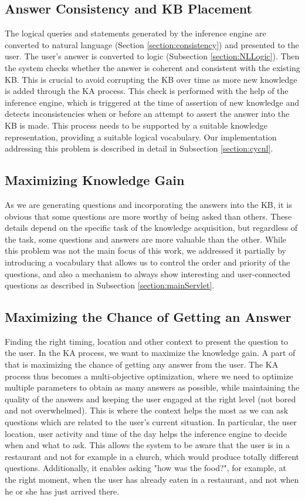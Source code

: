 \subsection{Answer Consistency and KB Placement}
The logical queries and statements generated by the inference engine are 
converted to natural language (Section \ref{section:consistency}) and presented to the user. The user's answer is converted to logic (Subsection \ref{section:NLLogic}). 
Then the system checks whether the answer is coherent and consistent with the 
existing KB. This is crucial to avoid corrupting the KB over time as more new 
knowledge is added through the KA process. This check is performed with the 
help of the inference engine, which is triggered at the time of assertion of 
new knowledge and detects inconsistencies when or before an attempt to 
assert the answer into the KB is made. This process needs to be supported by a 
suitable knowledge representation, providing a suitable logical vocabulary. 
Our implementation addressing this problem is described in detail in 
Subsection \ref{section:cycnl}.

\subsection{Maximizing Knowledge Gain} 
As we are generating questions and incorporating the answers into the KB, it 
is obvious that some questions are more worthy of being asked than others. 
These details depend on the specific task of the knowledge acquisition, but 
regardless of the task, some questions and answers are more valuable than the 
other. While this problem was not the main focus of this work, we addressed it 
partially by introducing a vocabulary that allows us to control the order and 
priority of the questions, and also a mechanism to always show interesting
and user-connected questions as described in Subsection \ref{section:mainServlet}.

\subsection{Maximizing the Chance of Getting an Answer}
Finding the right timing, location and other context to present the question
to the user. In the KA process, we want to maximize the knowledge gain. A part of 
that is maximizing the chance of getting any answer from the user. The KA 
process thus becomes a multi-objective optimization, where we need to optimize 
multiple parameters to obtain as many answers as possible, while maintaining the
quality of the answers and keeping the user engaged at the right level (not 
bored and not overwhelmed). This is where the context helps the most as we can 
ask questions which are related to the user's current situation. In particular, 
the user location, user activity and time of the day helps the inference 
engine to decide when and what to ask. This allows the system to be aware that 
the user is in a restaurant and not for example in a church, which would 
produce  totally different questions. Additionally, it enables asking 
"how was the food?", for example, at the right moment, when the user has 
already eaten in a restaurant, and not when he or she has just arrived there.

